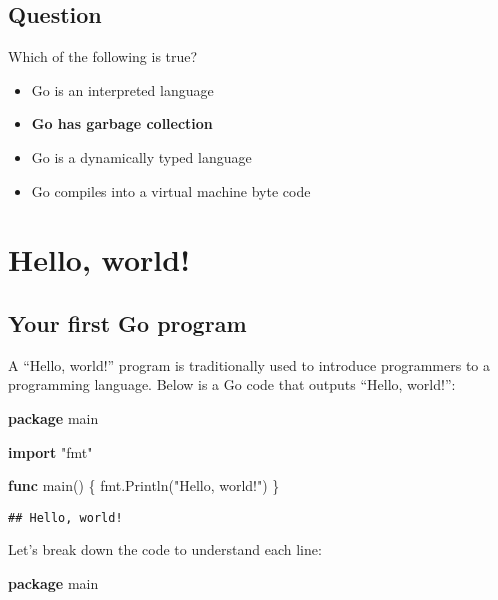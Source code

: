 \documentclass[]{book}
\newenvironment{Shaded}{\begin{snugshade}}{\end{snugshade}}
\newcommand{\KeywordTok}[1]{\textcolor[rgb]{0.13,0.29,0.53}{\textbf{#1}}}
\newcommand{\NormalTok}[1]{#1}
\newcommand{\StringTok}[1]{\textcolor[rgb]{0.31,0.60,0.02}{#1}}
\providecommand{\tightlist}{%
  \setlength{\itemsep}{0pt}\setlength{\parskip}{0pt}}
\begin{document}
\hypertarget{question-1}{%
\subsection*{Question}\label{question-1}}

Which of the following is true?

\begin{itemize}
\tightlist
\item
  Go is an interpreted language
\item
  \textbf{Go has garbage collection}
\item
  Go is a dynamically typed language
\item
  Go compiles into a virtual machine byte code
\end{itemize}

\hypertarget{hello-world}{%
\section{Hello, world!}\label{hello-world}}

\hypertarget{your-first-go-program}{%
\subsection{Your first Go program}\label{your-first-go-program}}

A ``Hello, world!'' program is traditionally used to introduce programmers to a
programming language. Below is a Go code that outputs ``Hello, world!'':

\begin{Shaded}
\begin{Highlighting}[]
\KeywordTok{package}\NormalTok{ main}

\KeywordTok{import} \StringTok{"fmt"}

\KeywordTok{func}\NormalTok{ main() \{}
\NormalTok{    fmt.Println(}\StringTok{"Hello, world!"}\NormalTok{)}
\NormalTok{\}}
\end{Highlighting}
\end{Shaded}

\begin{verbatim}
## Hello, world!
\end{verbatim}

Let's break down the code to understand each line:

\begin{Shaded}
\begin{Highlighting}[]
\KeywordTok{package}\NormalTok{ main}
\end{Highlighting}
\end{Shaded}
\end{document}
